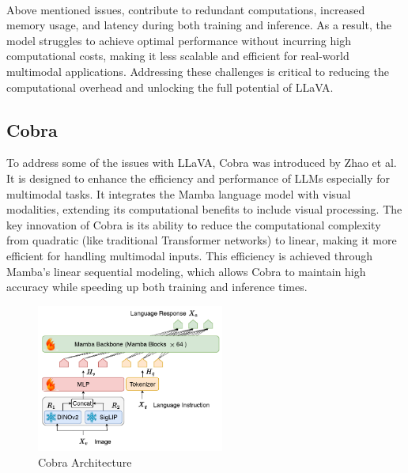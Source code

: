 \documentclass[12pt, conference, compsoc, onecolumn]{IEEEtran}
\begin{document}
	\hfill\\
	Above mentioned issues, contribute to redundant computations, increased memory usage, and latency during both training and inference. As a result, the model struggles to achieve optimal performance without incurring high computational costs, making it less scalable and efficient for real-world multimodal applications. Addressing these challenges is critical to reducing the computational overhead and unlocking the full potential of LLaVA.
	
	\subsection{Cobra}
	
	To address some of the issues with LLaVA, Cobra \cite{zhao2024cobraextendingmambamultimodal} was introduced by Zhao et al. It is designed to enhance the efficiency and performance of LLMs especially for multimodal tasks. It integrates the Mamba language model with visual modalities, extending its computational benefits to include visual processing. The key innovation of Cobra is its ability to reduce the computational complexity from quadratic (like traditional Transformer networks) to linear, making it more efficient for handling multimodal inputs. This efficiency is achieved through Mamba’s linear sequential modeling, which allows Cobra to maintain high accuracy while speeding up both training and inference times.
	
	\begin{figure}[H]
		\centering
		\includegraphics[width=0.55\textwidth]{figures/cobra.png}
		\caption{Cobra Architecture \cite{zhao2024cobraextendingmambamultimodal}}
		\label{fig:cobra_arch}
	\end{figure}
	
\end{document}
